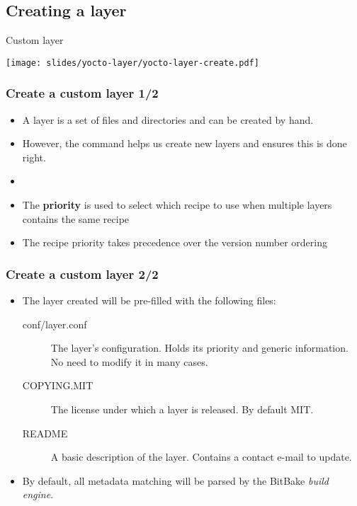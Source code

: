 \subsection{Creating a layer}

\begin{frame}{Custom layer}
  \begin{center}
    \texttt{[image: slides/yocto-layer/yocto-layer-create.pdf]}
  \end{center}
\end{frame}

\begin{frame}
  \frametitle{Create a custom layer 1/2}
  \begin{itemize}
    \item A layer is a set of files and directories and can be created
      by hand.
    \item However, the  command helps us create new
      layers and ensures this is done right.
    \item {}
    \item The \textbf{priority} is used to select which recipe to use when multiple layers contains the same recipe
    \item The recipe priority takes precedence over the version number ordering
  \end{itemize}
\end{frame}

\begin{frame}
  \frametitle{Create a custom layer 2/2}
  \begin{itemize}
    \item The layer created will be pre-filled with the following
          files:
    \begin{description}
      \item[conf/layer.conf] The layer's configuration. Holds its
        priority and generic information. No need to modify it in many
        cases.
      \item[COPYING.MIT] The license under which a layer is released.
        By default MIT.
      \item[README] A basic description of the layer. Contains a
        contact e-mail to update.
    \end{description}
    \item By default, all metadata matching 
          will be parsed by the BitBake \emph{build engine}.
  \end{itemize}
\end{frame}

